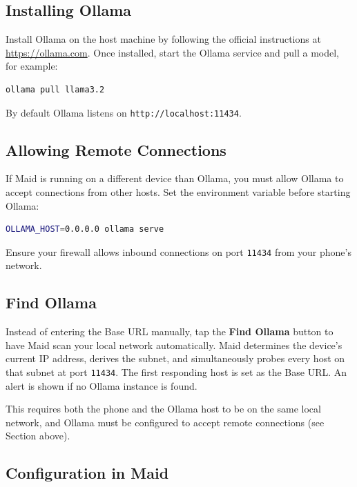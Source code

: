 \documentclass[12pt,a4paper]{article}
\begin{document}
\subsection{Installing Ollama}

Install Ollama on the host machine by following the official instructions at \url{https://ollama.com}. Once installed, start the Ollama service and pull a model, for example:

\begin{lstlisting}[language=bash]
ollama pull llama3.2
\end{lstlisting}

By default Ollama listens on \texttt{http://localhost:11434}.

\subsection{Allowing Remote Connections}

If Maid is running on a different device than Ollama, you must allow Ollama to accept connections from other hosts. Set the environment variable before starting Ollama:

\begin{lstlisting}[language=bash]
OLLAMA_HOST=0.0.0.0 ollama serve
\end{lstlisting}

Ensure your firewall allows inbound connections on port \texttt{11434} from your phone's network.

\subsection{Find Ollama}

Instead of entering the Base URL manually, tap the \textbf{Find Ollama} button to have Maid scan your local network automatically. Maid determines the device's current IP address, derives the subnet, and simultaneously probes every host on that subnet at port \texttt{11434}. The first responding host is set as the Base URL. An alert is shown if no Ollama instance is found.

This requires both the phone and the Ollama host to be on the same local network, and Ollama must be configured to accept remote connections (see Section above).

\subsection{Configuration in Maid}
\end{document}
